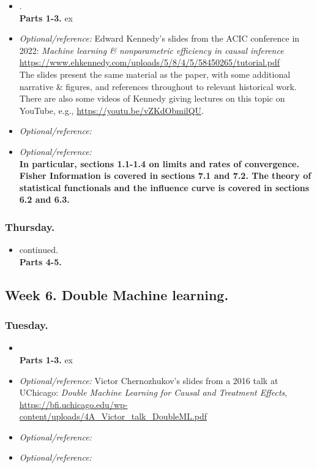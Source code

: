 \documentclass[letterpaper, 12pt, parskip=full,DIV=10]{scrartcl}
\begin{document}
\begin{itemize}
\item {}. \\
\textbf{Parts 1-3.} ex
\item  \textit{Optional/reference:} Edward Kennedy's slides from the ACIC conference in 2022: \textit{Machine learning \& nonparametric efficiency
in causal inference} \url{https://www.ehkennedy.com/uploads/5/8/4/5/58450265/tutorial.pdf}\\
The slides present the same material as the paper, with some additional narrative \& figures, and references throughout to relevant historical work. There are also some videos of Kennedy giving lectures on this topic on YouTube, e.g., \url{https://youtu.be/vZKdObmilQU}. 
\item  \textit{Optional/reference:} 
\item  \textit{Optional/reference:} \\
\textbf{In particular, sections 1.1-1.4 on limits and rates of convergence. Fisher Information is covered in sections 7.1 and 7.2. The theory of statistical functionals and the influence curve is covered in sections 6.2 and 6.3.}
\end{itemize}

\subsubsection*{Thursday.}
\begin{itemize}
\item \cite{kennedy2022semiparametric} continued. \\
\textbf{Parts 4-5.}
\end{itemize}

\subsection*{Week 6. Double Machine learning.}

\subsubsection*{Tuesday.}
\begin{itemize}
\item {} \\
\textbf{Parts 1-3.} ex
\item  \textit{Optional/reference:} Victor Chernozhukov's slides from a 2016 talk at UChicago: \textit{Double Machine Learning for Causal and Treatment Effects}, \url{https://bfi.uchicago.edu/wp-content/uploads/4A_Victor_talk_DoubleML.pdf}
\item  \textit{Optional/reference:} 
\item  \textit{Optional/reference:} 
\end{itemize}
\end{document}
